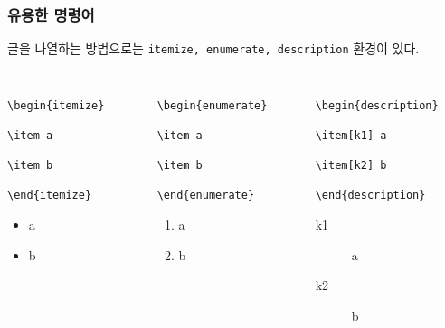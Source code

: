 \begin{frame}[fragile]
    \frametitle{유용한 명령어}

    글을 나열하는 방법으로는 \texttt{itemize, enumerate, description} 환경이 있다.

    \begin{columns}
        \begin{column}{0.3\textwidth}
            \begin{verbatim}
                \begin{itemize}
                    \item a
                    \item b
                \end{itemize}
            \end{verbatim}

            \begin{itemize}
                \item a
                \item b
            \end{itemize}
        \end{column}
        \begin{column}{0.3\textwidth}
            \begin{verbatim}
                \begin{enumerate}
                    \item a
                    \item b
                \end{enumerate}
            \end{verbatim}

            \begin{enumerate}
                \item a
                \item b
            \end{enumerate}
        \end{column}

        \begin{column}{0.3\textwidth}
            \begin{verbatim}
                \begin{description}
                    \item[k1] a
                    \item[k2] b
                \end{description}
            \end{verbatim}

            \begin{description}
                \item[k1] a
                \item[k2] b
            \end{description}
        \end{column}
    \end{columns}

\end{frame}

